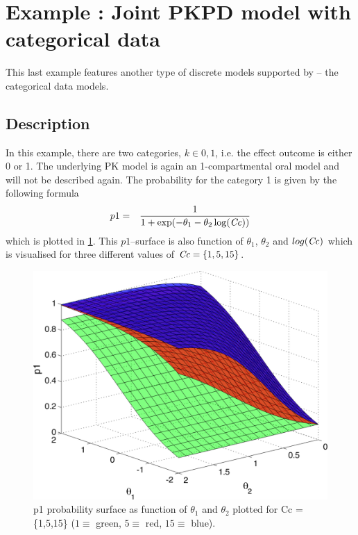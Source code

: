 

\section{Example \theexamples: Joint PKPD model with categorical data}
\label{sec:eg7}

This last example features another type of discrete models supported by \pml -- 
the categorical data models.

\subsection{Description}
\label{subsec:exp7_intro} 

In this example, there are two categories, $k \in {0,1}$, i.e. the effect outcome is either 0 or 1. 
The underlying PK model is again an 1-compartmental oral model and will not be described
again. The probability for the category 1 is given by the following formula 
\begin{eqnarray}
	p1 &=& \frac{1}{1+\exp(-\theta_1 - \theta_2 \log(\mathit{Cc}))} 	\label{eq:p1surface}
\end{eqnarray}
which is plotted in \ref{fig:p1surface}. This $p1$--surface is also function of $\theta_1$, 
$\theta_2$ and $log(\mathit{Cc})$ which is visualised for three different values of $\mathit{Cc} = \{1,5,15\}$. 

\begin{figure}[htbp]
\begin{center}
\includegraphics[width=.45\textwidth]{pics/p1_threeSurfaces.png}
\caption{p1 probability surface as function of $\theta_1$ and $\theta_2$ plotted for 
Cc = \{1,5,15\} ($1\equiv$ green, $5 \equiv$ red, $15 \equiv$ blue). }
\label{fig:p1surface}
\end{center}
\end{figure}

